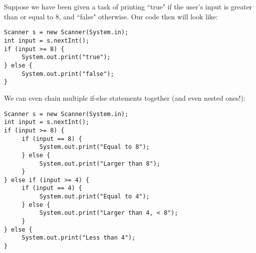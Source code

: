 \\ \\
Suppose we have been given a task of printing ``true" if the user's input is greater than or equal to 8, and ``false" otherwise. Our code then will look like:
\begin{lstlisting}
Scanner s = new Scanner(System.in);
int input = s.nextInt();
if (input >= 8) {
     System.out.print("true");
} else {
     System.out.print("false");
}
\end{lstlisting}
We can even chain multiple if-else statements together (and even nested ones!):
\begin{lstlisting}
Scanner s = new Scanner(System.in);
int input = s.nextInt();
if (input >= 8) {
     if (input == 8) {
          System.out.print("Equal to 8");
     } else {
          System.out.print("Larger than 8");
     }
} else if (input >= 4) {
     if (input == 4) {
          System.out.print("Equal to 4");
     } else {
          System.out.print("Larger than 4, < 8");
     }
} else {
     System.out.print("Less than 4");
}
\end{lstlisting}

